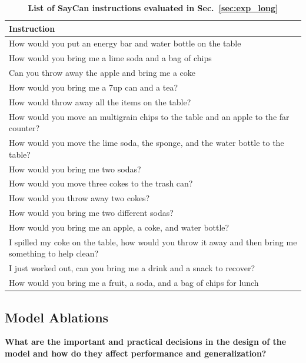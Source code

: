 \documentclass{article} %
\begin{document}
\begin{table}
\small
\begin{center}

\begin{tabular}{|p{}|}
\hline
\textbf{Instruction} \\ \hline
How would you put an energy bar and water bottle on the table  \\
How would you bring me a lime soda and a bag of chips  \\
Can you throw away the apple and bring me a coke \\
How would you bring me a 7up can and a tea?\\
How would throw away all the items on the table?  \\
How would you move an multigrain chips to the table and an apple to the far counter? \\
How would you move the lime soda, the sponge, and the water bottle to the table? \\
How would you bring me two sodas? \\
How would you move three cokes to the trash can? \\
How would you throw away two cokes?  \\
How would you bring me two different sodas? \\
How would you bring me an apple, a coke, and water bottle? \\
I spilled my coke on the table, how would you throw it away and then bring me something to help clean?  \\
I just worked out, can you bring me a drink and a snack to recover? \\
How would you bring me a fruit, a soda, and a bag of chips for lunch \\
\hline
\end{tabular}
\caption{\textbf{List of SayCan instructions evaluated in Sec.~\ref{sec:exp_long}}}
\label{tab:long_horizon_all_instructions}
\end{center}
\end{table}




\subsection{Model Ablations}
\textbf{What are the important and practical decisions in the design of the model and how do they affect performance and generalization?}
\label{sec:app_model_ablations}
\end{document}
